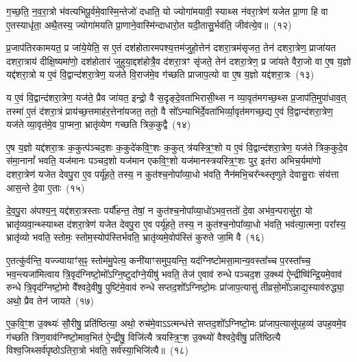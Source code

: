 ग॒च्छ॒ति॒ न॒व॒रा॒त्रो भ॑वत्यभिपू॒र्वमे॒वास्मि॒न्तेजो॑ दधाति॒ यो ज्योगा॑मयावी॒ स्याथ्स न॑वरा॒त्रेण॑ यजेत प्रा॒णा हि वा ए॒तस्याधृ॑ता॒ अथै॒तस्य॒ ज्योगा॑मयति प्रा॒णाने॒वास्मि॑न्दाधारो॒त यदी॒तासु॒र्भव॑ति॒ जीव॑त्ये॒व॥~(१२)

{\anuvakamend[{कल्प॑न्ते प्र॒जाना॒न्त्रय॑स्त्रिꣳशच्च}]}%

प्र॒जा\-प॑तिरकामयत॒ प्र जा॑ये॒येति॒ स ए॒तं दश॑होतारमपश्य॒त्तम॑जुहो॒त्तेन॑ दशरा॒त्रम॑सृजत॒ तेन॑ दशरा॒त्रेण॒ प्राजा॑यत दशरा॒त्राय॑ दीक्षि॒ष्यमा॑णो॒ दश॑होतारं जुहुया॒द्दश॑होत्रै॒व द॑शरा॒त्रꣳ सृ॑जते॒ तेन॑ दशरा॒त्रेण॒ प्र जा॑यते वैरा॒जो वा ए॒ष य॒ज्ञो यद्द॑शरा॒त्रो य ए॒वं वि॒द्वान्द॑शरा॒त्रेण॒ यज॑ते वि॒राज॑मे॒व ग॑च्छति प्राजाप॒त्यो वा ए॒ष य॒ज्ञो यद्द॑शरा॒त्रः~(१३)

य ए॒वं वि॒द्वान्द॑शरा॒त्रेण॒ यज॑ते॒ प्रैव जा॑यत॒ इन्द्रो॒ वै स॒दृङ्दे॒वता॑भिरासी॒थ्स न व्या॒वृत॑मगच्छ॒थ्स प्र॒जा\-प॑ति॒मुपा॑धाव॒त् तस्मा॑ ए॒तं द॑शरा॒त्रं प्राय॑च्छ॒त्तमाह॑र॒त्तेना॑यजत॒ ततो॒ वै सो᳚\-ऽन्याभि॑र्दे॒वता॑भिर्व्या॒वृत॑मगच्छ॒द्य ए॒वं वि॒द्वान्द॑शरा॒त्रेण॒ यज॑ते व्या॒वृत॑मे॒व पा॒प्मना॒ भ्रातृ॑व्येण गच्छति त्रिक॒कुद्वै~(१४)

ए॒ष य॒ज्ञो यद्द॑शरा॒त्रः क॒कुत्प॑ञ्चद॒शः क॒कुदे॑कवि॒ꣳ॒शः क॒कुत् त्र॑यस्त्रि॒ꣳ॒शो य ए॒वं वि॒द्वान्द॑शरा॒त्रेण॒ यज॑ते त्रिक॒कुदे॒व स॑मा॒नानां᳚ भवति॒ यज॑मानः पञ्चद॒शो यज॑मान एकवि॒ꣳ॒शो यज॑मानस्त्रयस्त्रि॒ꣳ॒शः पुर॒ इत॑रा अभिच॒र्यमा॑णो दशरा॒त्रेण॑ यजेत देवपु॒रा ए॒व पर्यू॑हते॒ तस्य॒ न कुत॑श्च॒नोपा᳚व्या॒धो भ॑वति॒ नैन॑मभि॒चर᳚न्थ्स्तृणुते देवासु॒राः संय॑त्ता आस॒न्ते दे॒वा ए॒ताः~(१५)

दे॒व॒पु॒रा अ॑पश्य॒न्॒ यद्द॑शरा॒त्रस्ताः पर्यौ॑हन्त॒ तेषां॒ न कुत॑श्च॒नोपा᳚व्या॒धो॑\-ऽभव॒त्ततो॑ दे॒वा अभ॑व॒न्परासु॑रा॒ यो भ्रातृ॑व्यवा॒न्थ्स्याथ्स द॑शरा॒त्रेण॑ यजेत देवपु॒रा ए॒व पर्यू॑हते॒ तस्य॒ न कुत॑श्च॒नोपा᳚व्या॒धो भ॑वति॒ भव॑त्या॒त्मना॒ परा᳚स्य॒ भ्रातृ॑व्यो भवति॒ स्तोमः॒ स्तोम॒स्योप॑स्तिर्भवति॒ भ्रातृ॑व्यमे॒वोप॑स्तिं कुरुते जा॒मि वै~(१६)

ए॒तत्कु॑र्वन्ति॒ यज्ज्यायाꣳ॑स॒ꣴ॒ स्तोम॑मु॒पेत्य॒ कनी॑याꣳसमुप॒यन्ति॒ यद॑ग्निष्टोमसा॒मान्य॒वस्ता᳚च्च प॒रस्ता᳚च्च॒ भव॒न्त्यजा॑मित्वाय त्रि॒वृद॑ग्निष्टो॒मो᳚\-ऽग्नि॒ष्टुदा᳚ग्ने॒यीषु॑ भवति॒ तेज॑ ए॒वाव॑ रुन्धे पञ्चद॒श उ॒क्थ्य॑ ऐ॒न्द्रीष्वि॑न्द्रि॒यमे॒वाव॑ रुन्धे त्रि॒वृद॑ग्निष्टो॒मो वै᳚श्वदे॒वीषु॒ पुष्टि॑मे॒वाव॑ रुन्धे सप्तद॒शो᳚\-ऽग्निष्टो॒मः प्रा॑जाप॒त्यासु॑ तीव्रसो॒मो᳚\-ऽन्नाद्य॒स्याव॑रुद्ध्या॒ अथो॒ प्रैव तेन॑ जायते~(१७)

ए॒क॒वि॒ꣳ॒श उ॒क्थ्यः॑ सौ॒रीषु॒ प्रति॑ष्ठित्या॒ अथो॒ रुच॑मे॒वा\-ऽऽ\-त्मन्ध॑त्ते सप्तद॒शो᳚\-ऽग्निष्टो॒मः प्रा॑जाप॒त्यासू॑पह॒व्य॑ उपह॒वमे॒व ग॑च्छति त्रिण॒वाव॑ग्निष्टो॒माव॒भित॑ ऐ॒न्द्रीषु॒ विजि॑त्यै त्रयस्त्रि॒ꣳ॒श उ॒क्थ्यो॑ वैश्वदे॒वीषु॒ प्रति॑ष्ठित्यै विश्व॒जिथ्सर्व॑पृष्ठो\-ऽतिरा॒त्रो भ॑वति॒ सर्व॑स्या॒भिजि॑त्यै॥~(१८)


